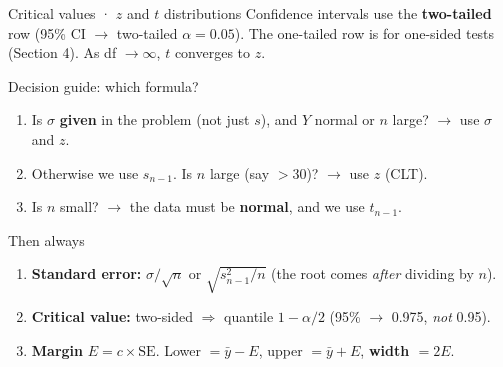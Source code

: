 \documentclass[
  11pt,
  ignorenonframetext,
  aspectratio=169,
]{beamer}
\providecommand{\tightlist}{%
  \setlength{\itemsep}{0pt}\setlength{\parskip}{0pt}}
\newcommand{\se}{\mathrm{SE}}
\begin{document}
\begin{frame}[shrink=5]{Critical values · \(z\) and \(t\) distributions}
\vspace{0.6em}
\centering\scriptsize Confidence intervals use the \textbf{two-tailed} row
(95\% CI \(\to\) two-tailed \(\alpha=0.05\)). The one-tailed row is for
one-sided tests (Section 4). As df \(\to\infty\), \(t\) converges to \(z\).
\end{frame}


\begin{frame}{Decision guide: which formula?}
\protect{}\label{decision-guide-which-formula}
\begin{enumerate}
\tightlist
\item
  Is \(\sigma\) \textbf{given} in the problem (not just \(s\)), and
  \(Y\) normal or \(n\) large? \(\to\) use \(\sigma\) and \(z\).
\item
  Otherwise we use \(s_{n-1}\). Is \(n\) large (say \(>30\))? \(\to\)
  use \(z\) (CLT).
\item
  Is \(n\) small? \(\to\) the data must be \textbf{normal}, and we use
  \(t_{n-1}\).
\end{enumerate}

\begin{block}{Then always}
\protect{}\label{then-always}
\begin{enumerate}
\tightlist
\item
  \textbf{Standard error:} \(\sigma/\sqrt n\) or \(\sqrt{s^2_{n-1}/n}\)
  (the root comes \emph{after} dividing by \(n\)).
\item
  \textbf{Critical value:} two-sided \(\Rightarrow\) quantile
  \(1-\alpha/2\) (95\% \(\to\) 0.975, \emph{not} 0.95).
\item
  \textbf{Margin} \(E=c\times\se\). Lower \(=\bar y-E\), upper
  \(=\bar y+E\), \textbf{width \(=2E\)}.
\end{enumerate}
\end{block}
\end{frame}
\end{document}
